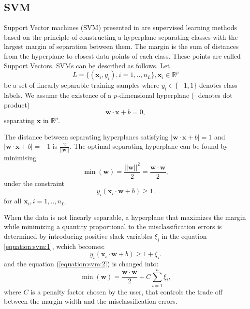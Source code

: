 \documentclass[]{article}
\newcommand{\R}{\mathbb{R}}
\begin{document}
\subsection{SVM} \label{SVM}
Support Vector machines (SVM) presented in \cite{Byun:2002} are supervised
learning methods based on the principle of constructing a hyperplane separating
classes with the largest margin of separation between them. The margin is the
sum of distances from the hyperplane to closest data points of each class. These
points are called Support Vectors. SVMs  can be described as follows. Let 
\begin{equation*}
L=\{(\mathbf{x}_i,y_i),i=1,..,n_L\}, \mathbf{x}_i\in\R^{p}
\end{equation*}
be a set of linearly separable training samples where $y_i\in\{-1,1\}$ denotes 
class labels. We assume the existence of a $p$-dimensional hyperplane ($\cdot$
denotes dot product)
\begin{equation*}
\mathbf{w}\cdot \mathbf{x}+b = 0,
\end{equation*}
 separating $\mathbf{x}$ in $\R^{p}$.

The distance between separating hyperplanes satisfying $|\mathbf{w}\cdot 
\mathbf{x}+b|=1$ and $|\mathbf{w}\cdot \mathbf{x}+b|=-1$ is 
$\frac{2}{||\mathbf{w}||}$. The optimal separating hyperplane can be found by 
minimising 
\begin{equation}
\label{equation:svm:2}
\min(\mathbf{w})=\frac{{||\mathbf{w}||}^2}{2}=\frac{\mathbf{w} \cdot 
\mathbf{w}}{2}, 
\end{equation}
under the constraint
\begin{equation}
\label{equation:svm:1}
y_i (\mathbf{x}_i\cdot \mathbf{w}+b) \geq 1.
\end{equation}
for all $\mathbf{x}_i, i=1,..,n_L$.

When the data is not linearly separable, a hyperplane that maximizes the margin
while minimizing a quantity proportional to the misclassification errors is
determined by introducing positive slack variables $\xi_i$ in the equation
\ref{equation:svm:1}, wchich becomes:
\begin{equation}
\label{equation:svm:3}
y_i (\mathbf{x}_i\cdot \mathbf{w}+b) \geq 1+\xi_i.
\end{equation}
and the equation (\ref{equation:svm:2}) is changed into:
\begin{equation}
\label{equation:svm:4}
\min(\mathbf{w})=\frac{\mathbf{w} \cdot \mathbf{w}}{2}+C\sum_{i=1}^{n}\xi_i, 
\end{equation}
where $C$ is a penalty factor chosen by the user, that controls the trade off 
between the margin width and the misclassification errors. 
\end{document}

